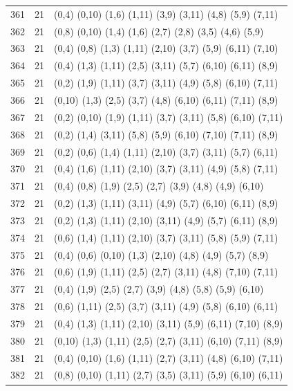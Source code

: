 \begin{appendix}
{\begin{longtable}{lll}
361& 21 & (0,4)   (0,10) (1,6)  (1,11)  (3,9)   (3,11)  (4,8)   (5,9)   (7,11)\\
362& 21 & (0,8)   (0,10) (1,4)  (1,6)   (2,7)   (2,8)   (3,5)   (4,6)   (5,9)\\
363& 21 & (0,4)   (0,8)  (1,3)  (1,11)  (2,10)  (3,7)   (5,9)   (6,11)  (7,10)\\
364& 21 & (0,4)   (1,3)  (1,11) (2,5)   (3,11)  (5,7)   (6,10)  (6,11)  (8,9)\\
365& 21 & (0,2)   (1,9)  (1,11) (3,7)   (3,11)  (4,9)   (5,8)   (6,10)  (7,11)\\
366& 21 & (0,10)  (1,3)  (2,5)  (3,7)   (4,8)   (6,10)  (6,11)  (7,11)  (8,9)\\
367& 21 & (0,2)   (0,10) (1,9)  (1,11)  (3,7)   (3,11)  (5,8)   (6,10)  (7,11)\\
368& 21 & (0,2)   (1,4)  (3,11) (5,8)   (5,9)   (6,10)  (7,10)  (7,11)  (8,9)\\
369& 21 & (0,2)   (0,6)  (1,4)  (1,11)  (2,10)  (3,7)   (3,11)  (5,7)   (6,11)\\
370& 21 & (0,4)   (1,6)  (1,11) (2,10)  (3,7)   (3,11)  (4,9)   (5,8)   (7,11)\\
371& 21 & (0,4)   (0,8)  (1,9)  (2,5)   (2,7)   (3,9)   (4,8)   (4,9)   (6,10)\\
372& 21 & (0,2)   (1,3)  (1,11) (3,11)  (4,9)   (5,7)   (6,10)  (6,11)  (8,9)\\
373& 21 & (0,2)   (1,3)  (1,11) (2,10)  (3,11)  (4,9)   (5,7)   (6,11)  (8,9)\\
374& 21 & (0,6)   (1,4)  (1,11) (2,10)  (3,7)   (3,11)  (5,8)   (5,9)   (7,11)\\
375& 21 & (0,4)   (0,6)  (0,10) (1,3)   (2,10)  (4,8)   (4,9)   (5,7)   (8,9)\\
376& 21 & (0,6)   (1,9)  (1,11) (2,5)   (2,7)   (3,11)  (4,8)   (7,10)  (7,11)\\
377& 21 & (0,4)   (1,9)  (2,5)  (2,7)   (3,9)   (4,8)   (5,8)   (5,9)   (6,10)\\
378& 21 & (0,6)   (1,11) (2,5)  (3,7)   (3,11)  (4,9)   (5,8)   (6,10)  (6,11)\\
379& 21 & (0,4)   (1,3)  (1,11) (2,10)  (3,11)  (5,9)   (6,11)  (7,10)  (8,9)\\
380& 21 & (0,10)  (1,3)  (1,11) (2,5)   (2,7)   (3,11)  (6,10)  (7,11)  (8,9)\\
381& 21 & (0,4)   (0,10) (1,6)  (1,11)  (2,7)   (3,11)  (4,8)   (6,10)  (7,11)\\
382& 21 & (0,8)   (0,10) (1,11) (2,7)   (3,5)   (3,11)  (5,9)   (6,10)  (6,11)\\

\end{longtable}}
\end{appendix}
